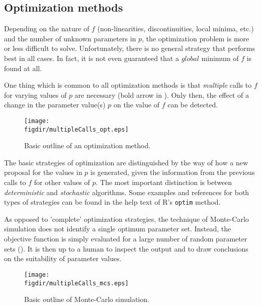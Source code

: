 \subsection{Optimization methods} \label{sec:mops:background:optimization:methods}

Depending on the nature of $f$ (non-linearities, discontinuities, local minima, etc.) and the number of unknown parameters in $p$, the optimization problem is more or less difficult to solve. Unfortunately, there is no general strategy that performs best in all cases. In fact, it is not even guaranteed that a $global$ minimum of $f$ is found at all.

One thing which is common to all optimization methods is that \emph{multiple} calls to $f$ for varying values of $p$ are necessary (bold arrow in ). Only then, the effect of a change in the parameter value(s) $p$ on the value of $f$ can be detected.

\begin{figure}
  \centering
  \texttt{[image: \\figdir/multipleCalls\_opt.eps]}
  \caption{Basic outline of an optimization method. \label{fig:mops:concepts:optimization:multipleCalls_opt}}
\end{figure}

The basic strategies of optimization are distinguished by the way of how a new proposal for the values in $p$ is generated, given the information from the previous calls to $f$ for other values of $p$. The most important distinction is between \emph{deterministic} and \emph{stochastic} algorithms. Some examples and references for both types of strategies can be found in the help text of R's \texttt{optim} method.

As opposed to 'complete' optimization strategies, the technique of Monte-Carlo simulation does not identify a single optimum parameter set. Instead, the objective function is simply evaluated for a large number of random parameter sets (). It is then up to a human to inspect the output and to draw conclusions on the suitability of parameter values.

\begin{figure}
  \centering
  \texttt{[image: \\figdir/multipleCalls\_mcs.eps]}
  \caption{Basic outline of Monte-Carlo simulation. \label{fig:mops:concepts:optimization:multipleCalls_mcs}}
\end{figure}

